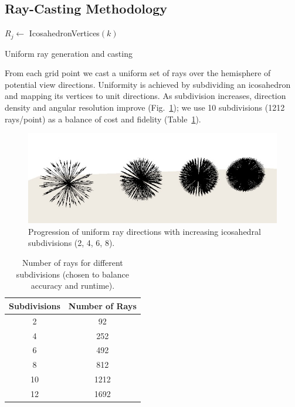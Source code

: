 \documentclass[final,3p,times,review]{elsarticle}
\begin{document}
\subsection{Ray-Casting Methodology}
\label{sec:raycasting}
\begin{algorithm}[H]
\SetAlgoLined
{}
$R_j \leftarrow$ IcosahedronVertices$(k)$\;
\caption{Uniform ray generation and casting}
\end{algorithm}
From each grid point we cast a uniform set of rays over the hemisphere of potential view directions. Uniformity is achieved by subdividing an icosahedron and mapping its vertices to unit directions. As subdivision increases, direction density and angular resolution improve (Fig.~\ref{fig:raycasting}); we use 10 subdivisions (1212 rays/point) as a balance of cost and fidelity (Table~\ref{tab:subdivisions}).

\begin{figure}[H]
    \centering
    \includegraphics[width=.6\textwidth]{ray-casting.jpg}
    \caption{Progression of uniform ray directions with increasing icosahedral subdivisions (2, 4, 6, 8).}
    \label{fig:raycasting}
\end{figure}

\begin{table}[H]
    \centering
    \caption{Number of rays for different subdivisions (chosen to balance accuracy and runtime).}
    \label{tab:subdivisions}
    \begin{tabular}{cc}
        \toprule
        \textbf{Subdivisions} & \textbf{Number of Rays} \\
        \midrule
        2 & 92 \\
        4 & 252 \\
        6 & 492 \\
        8 & 812 \\
        10 & 1212 \\
        12 & 1692 \\
        \bottomrule
    \end{tabular}
\end{table}
\end{document}
